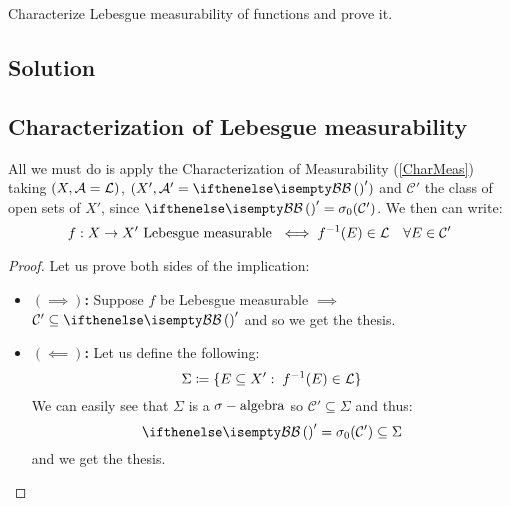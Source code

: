

\question

Characterize Lebesgue measurability of functions and prove it.

\subsection*{Solution}

\subsection{Characterization of Lebesgue measurability}
All we must do is apply the Characterization of Measurability (\ref{CharMeas}) taking $(X,\mathcal{A}=\mathcal{L})$, $(X', \A'=\B')$ and $\mathcal{C}'$ the class of open sets of $X'$, since $\B'=\sigma_0(\mathcal{C}')$. We then can write:
\[
    f:X\to X' \text{ Lebesgue measurable } \iff f^{-1}(E)\in\mathcal{L} \quad \forall E\in\mathcal{C}'
\]

\begin{proof}
    Let us prove both sides of the implication:
    \begin{itemize}
        \item \textbf{$(\implies)$:} Suppose $f$ be Lebesgue measurable $\implies$ $\mathcal{C}'\subseteq \B'$ and so we get the thesis.
        \item \textbf{$(\impliedby)$:} Let us define the following:
              \[
                  \Sigma \coloneqq \{ E\subseteq X': \; f^{-1}(E)\in\mathcal{L} \}
              \]
              We can easily see that $\Sigma$ is a $\sigma-\text{algebra}$ so $\mathcal{C}'\subseteq \Sigma$ and thus:
              \[
                  \B'=\sigma_0(\mathcal{C}')\subseteq\Sigma
              \]
              and we get the thesis.
    \end{itemize}
\end{proof}
